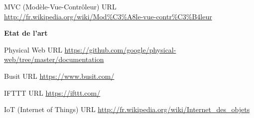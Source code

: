 \documentclass[nocopyrightspace]{sigplanconf}
\begin{document}
\begin{thebibliography}{10}
MVC (Modèle-Vue-Contrôleur)
\newblock URL \url{http://fr.wikipedia.org/wiki/Mod%C3%A8le-vue-contr%C3%B4leur}

\item[]\hspace{-\labelwidth}\hspace{-\labelsep}\textbf{Etat de l'art}

Physical Web
\newblock URL \url{https://github.com/google/physical-web/tree/master/documentation}

Busit
\newblock URL \url{https://www.busit.com/}

IFTTT
\newblock URL \url{https://ifttt.com/}

IoT (Internet of Things)
\newblock URL \url{http://fr.wikipedia.org/wiki/Internet_des_objets}


\end{thebibliography}
\end{document}
